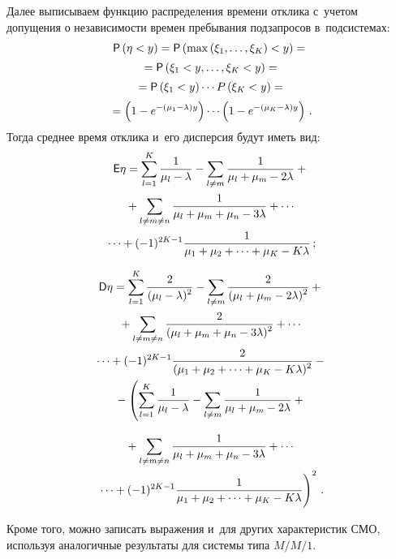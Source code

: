 \begin{multicols}{2}
  Далее выписываем функцию распределения времени отклика с~учетом 
допущения о независимости времен пребывания подзапросов в~под\-сис\-те\-мах:
  \begin{multline*}
  {\sf P}\left( \eta<y\right) ={\sf P}\left( \max \left( \xi_1,\ldots , \xi_K\right) <y\right) ={}\\[2pt]
  {}=
{\sf  P}\left( \xi_1<y,\ldots , \xi_K<y\right) ={}\\[2pt]
  {}=
  {\sf P}\left( \xi_1<y\right) \cdots P\left( \xi_K<y\right) ={}\\[2pt]
  {}= \left( 1-e^{-(\mu_1-\lambda)y}\right) \cdots \left( 1- e^{-(\mu_K-
\lambda)y}\right)\,.
  \end{multline*}
    Тогда среднее время отклика и~его дисперсия будут иметь вид:
  \begin{multline*}
{\sf  E}\eta = \sum\limits^K_{l=1} \displaystyle\frac{\displaystyle 1\mathstrut}{\displaystyle \mu_l-\lambda\mathstrut} - \sum\limits_{l\ne m} 
\displaystyle\frac{\displaystyle 1\mathstrut}{\displaystyle \mu_l+\mu_m-2\lambda\mathstrut} +{}\\
{}+\sum\limits_{l\ne m\ne n} \displaystyle\frac{\displaystyle 1\mathstrut}{\displaystyle \mu_l 
+\mu_m+\mu_n-3\lambda\mathstrut}+\cdots{}\\
  {}\cdots + (-1)^{2K-1} \displaystyle\frac{\displaystyle 1\mathstrut}{\displaystyle \mu_1+\mu_2+\cdots+\mu_K-K\lambda\mathstrut}\,;
  \end{multline*}
  
  \vspace*{-12pt}
  
  \noindent
  \begin{multline*}
{\sf   D}\eta = \sum\limits^K_{l=1} \displaystyle\frac{\displaystyle 2\mathstrut}{\displaystyle (\mu_l-\lambda)^2\mathstrut} -\sum\limits_{l\ne m} 
\displaystyle\frac{\displaystyle 2\mathstrut}{\displaystyle (\mu_l+\mu_m-2\lambda)^2\mathstrut} +{}\\
{}+ \sum\limits_{l\ne m\ne n} 
\displaystyle\frac{\displaystyle 2\mathstrut}{\displaystyle (\mu_l+\mu_m+\mu_n-3\lambda)^2\mathstrut}+\cdots{}\\
  {}\cdots+ (-1)^{2K-1} \displaystyle\frac{\displaystyle 2\mathstrut}{\displaystyle (\mu_1+\mu_2+\cdots+ \mu_K - K\lambda)^2\mathstrut} -{}\\
  {}-
  \left( \sum\limits^K_{l=1} \displaystyle\frac{\displaystyle 1\mathstrut}{\displaystyle \mu_l-\lambda\mathstrut}- \sum\limits_{l\ne m} 
\displaystyle\frac{\displaystyle 1\mathstrut}{\displaystyle \mu_l+\mu_m-2\lambda\mathstrut}+{}\right.
\end{multline*}

\noindent
  \begin{multline*}
   {}+ \sum\limits_{l\ne m\ne n} \fr{1}{\mu_l+\mu_m+\mu_n-3\lambda} 
+\cdots{}\\
\left.{}\cdots + (-1)^{2K-1} \fr{1}{\mu_1 +\mu_2 +\cdots + \mu_K-K\lambda}
\vphantom{\sum\limits^K_{l=1} \fr{1}{\mu_l-\lambda}}
\right)^2\,.
  \end{multline*}

  Кроме того, можно записать выражения и~для других характеристик СМО, 
используя аналогичные результаты для системы типа  $M/M/1$.


\end{multicols}

